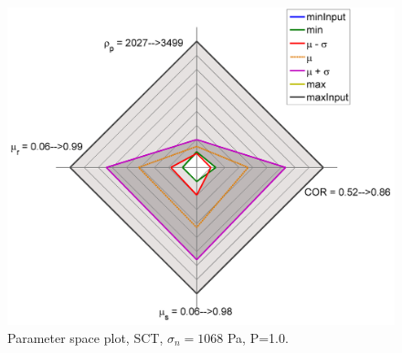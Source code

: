 \begin{figure}[!htbp] 
\centering 
\includegraphics[width=.60\columnwidth]{images/041radarpirker1schulze1068}
\caption[Parameter space plot 1]
{Parameter space plot, \acs{SCT}, $\sigma_n=1068$ Pa, P=1.0.}
\label{fig:041radarpirker1schulze1068}
\end{figure}